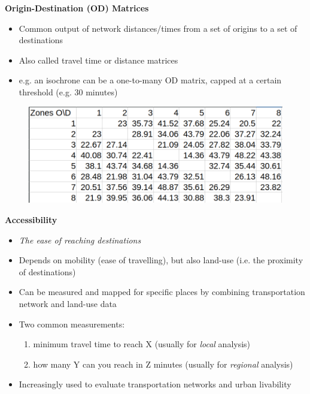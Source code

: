 \documentclass[aspectratio=169]{beamer}
\begin{document}
\begin{frame}
	
	\textbf{Origin-Destination (OD) Matrices}
	\begin{itemize}
		\item Common output of network distances/times from a set of origins to a set of destinations
		\item Also called travel time or distance matrices
		\item e.g. an isochrone can be a one-to-many OD matrix, capped at a certain threshold (e.g. 30 minutes)
	\end{itemize}
	
	\begin{figure}
		\centering
		\includegraphics[width=0.66\linewidth]{images/odmatrix}
	\end{figure}
	
\end{frame}




\begin{frame}
	
	\textbf{Accessibility}

	\begin{itemize}
		\item \textit{The ease of reaching destinations}
		\item Depends on mobility (ease of travelling), but also land-use (i.e. the proximity of destinations)
		
		\item Can be measured and mapped for specific places by combining transportation network and land-use data 
		
		\item Two common measurements: 
		\begin{enumerate}
			\item minimum travel time to reach X (usually for \textit{local} analysis)
			\item how many Y can you reach in Z minutes (usually for \textit{regional} analysis)
		\end{enumerate}
	
		\item Increasingly used to evaluate transportation networks and urban livability
		
	\end{itemize}
	
\end{frame}
\end{document}
